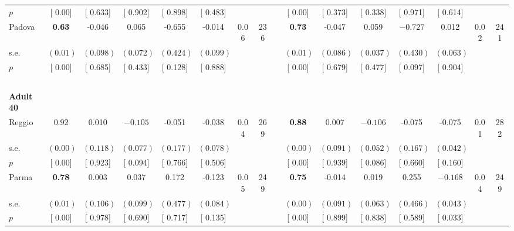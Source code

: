 \begin{longtable}{L{8em} c c c c c c c p{1em} c c c c c c c}
\quad \quad \quad \quad $ p$ & [     0.00] & [    0.633] & [    0.902] & [    0.898] & [    0.483] & & & & [     0.00] & [    0.373] & [    0.338] & [    0.971] & [    0.614] & &  \\[1em]
\quad \quad \quad Padova& \textbf{     0.63} &    -0.046 &     0.065 &    -0.655 &    -0.014 &      0.06 &       236 & & \textbf{     0.73} &    -0.047 &     0.059 & $ \mathbf{   -0.727}$ &     0.012 &      0.02 &       241  \\*
\quad \quad \quad \quad s.e.& $ (     0.01)$ & $ (    0.098)$ & $ (    0.072)$ & $ (    0.424)$ & $ (    0.099)$ & & & & $ (     0.01)$ & $ (    0.086)$ & $ (    0.037)$ & $ (    0.430)$ & $ (    0.063)$ & &  \\*
\quad \quad \quad \quad $ p$ & [     0.00] & [    0.685] & [    0.433] & [    0.128] & [    0.888] & & & & [     0.00] & [    0.679] & [    0.477] & [    0.097] & [    0.904] & &  \\[1em]
~\\[1em]
\quad \quad \textbf{Adult 40} & & & & & & & & & & & & & & & \\* 
\quad \quad \quad Reggio& 0.92 &     0.010 & $ \mathbf{   -0.105}$ &    -0.051 &    -0.038 &      0.04 &       269 & & \textbf{     0.88} &     0.007 & $ \mathbf{   -0.106}$ &    -0.075 &    -0.075 &      0.01 &       282  \\*
\quad \quad \quad \quad s.e.& $ (     0.00)$ & $ (    0.118)$ & $ (    0.077)$ & $ (    0.177)$ & $ (    0.078)$ & & & & $ (     0.00)$ & $ (    0.091)$ & $ (    0.052)$ & $ (    0.167)$ & $ (    0.042)$ & &  \\*
\quad \quad \quad \quad $ p$ & [     0.00] & [    0.923] & [    0.094] & [    0.766] & [    0.506] & & & & [     0.00] & [    0.939] & [    0.086] & [    0.660] & [    0.160] & &  \\[1em]
\quad \quad \quad Parma& \textbf{     0.78} &     0.003 &     0.037 &     0.172 &    -0.123 &      0.05 &       249 & & \textbf{     0.75} &    -0.014 &     0.019 &     0.255 & $ \mathbf{   -0.168}$ &      0.04 &       249  \\*
\quad \quad \quad \quad s.e.& $ (     0.01)$ & $ (    0.106)$ & $ (    0.099)$ & $ (    0.477)$ & $ (    0.084)$ & & & & $ (     0.00)$ & $ (    0.091)$ & $ (    0.063)$ & $ (    0.466)$ & $ (    0.043)$ & &  \\*
\quad \quad \quad \quad $ p$ & [     0.00] & [    0.978] & [    0.690] & [    0.717] & [    0.135] & & & & [     0.00] & [    0.899] & [    0.838] & [    0.589] & [    0.033] & &  \\[1em]

\end{longtable}
